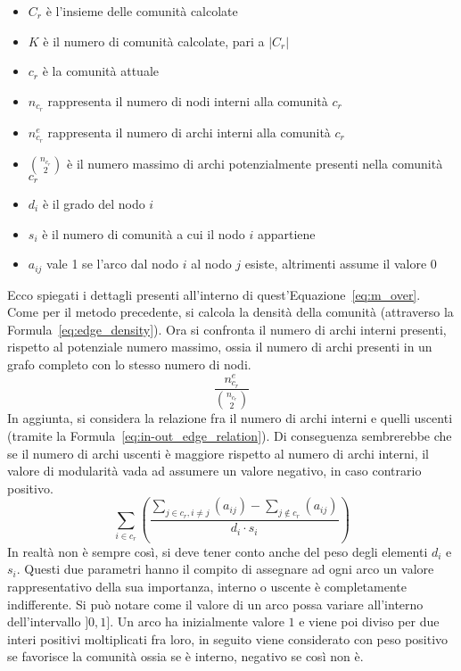 \begin{itemize}
	\item $C_r$ è l'insieme delle comunità calcolate
	\item $K$ è il numero di comunità calcolate, pari a $|C_r|$
	\item $c_r$ è la comunità attuale
	\item $n_{c_r}$ rappresenta il numero di nodi interni alla comunità $c_r$
	\item $n^e_{c_r}$ rappresenta il numero di archi interni alla comunità $c_r$
	\item $\binom{n_{c_r}}{2}$ è il numero massimo di archi potenzialmente presenti nella comunità $c_r$
	\item $d_i$ è il grado del nodo $i$
	\item $s_i$ è il numero di comunità a cui il nodo $i$ appartiene
	\item $a_{ij}$ vale 1 se l'arco dal nodo $i$ al nodo $j$ esiste, altrimenti assume il valore 0
\end{itemize}
%
Ecco spiegati i dettagli presenti all'interno di quest'Equazione~\ref{eq:m_over}.\\
Come per il metodo precedente, si calcola la densità della comunità (attraverso la Formula~\ref{eq:edge_density}). Ora si confronta il numero di archi interni presenti, rispetto al potenziale numero massimo, ossia il numero di archi presenti in un grafo completo con lo stesso numero di nodi.
\begin{equation}
	\frac{ n^e_{c_r} }{ \binom{n_{c_r}}{2} }
	\label{eq:edge_density}
\end{equation}
%
In aggiunta, si considera la relazione fra il numero di archi interni e quelli uscenti (tramite la Formula~\ref{eq:in-out_edge_relation}). Di conseguenza sembrerebbe che se il numero di archi uscenti è maggiore rispetto al numero di archi interni, il valore di modularità vada ad assumere un valore negativo, in caso contrario positivo.\\
\begin{equation}
	\sum\limits_{i \in c_r} \left( \frac{
		\sum\limits_{j \in c_r, i \neq j} \left( a_{ij} \right) - 
		\sum\limits_{j \notin c_r} \left( a_{ij} \right) 
	} {d_i \cdot s_i} \right)
	\label{eq:in-out_edge_relation}
\end{equation}
In realtà non è sempre così, si deve tener conto anche del peso degli elementi $d_i$ e $s_i$. Questi due parametri hanno il compito di assegnare ad ogni arco un valore rappresentativo della sua importanza, interno o uscente è completamente indifferente. Si può notare come il valore di un arco possa variare all'interno dell'intervallo $]0, 1]$. Un arco ha inizialmente valore $1$ e viene poi diviso per due interi positivi moltiplicati fra loro, in seguito viene considerato con peso positivo se favorisce la comunità ossia se è interno, negativo se così non è.\\
